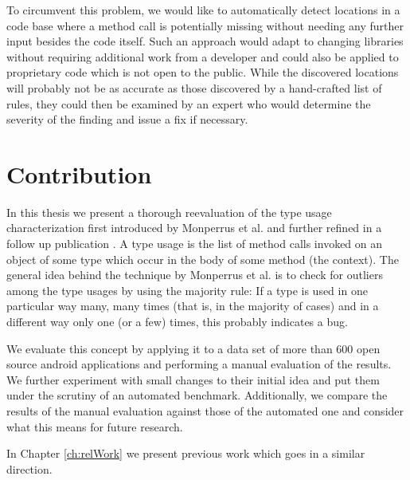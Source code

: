 To circumvent this problem, we would like to automatically detect locations in a code base where a method call is potentially missing without needing any further input besides the code itself.
Such an approach would adapt to changing libraries without requiring additional work from a developer and could also be applied to proprietary code which is not open to the public.
While the discovered locations will probably not be as accurate as those discovered by a hand-crafted list of rules, they could then be examined by an expert who would determine the severity of the finding and issue a fix if necessary.



\section{Contribution}

In this thesis we present a thorough reevaluation of the type usage characterization first introduced by Monperrus et al. \cite{monperrus2010detecting} and further refined in a follow up publication \cite{monperrus2013detecting}.
A type usage is the list of method calls invoked on an object of some type which occur in the body of some method (the context).
The general idea behind the technique by Monperrus et al. is to check for outliers among the type usages by using the majority rule:
If a type is used in one particular way many, many times (that is, in the majority of cases) and in a different way only one (or a few) times, this probably indicates a bug.

We evaluate this concept by applying it to a data set of more than 600 open source android applications and performing a manual evaluation of the results.
We further experiment with small changes to their initial idea and put them under the scrutiny of an automated benchmark.
Additionally, we compare the results of the manual evaluation against those of the automated one and consider what this means for future research.

In Chapter \ref{ch:relWork} we present previous work which goes in a similar direction.
